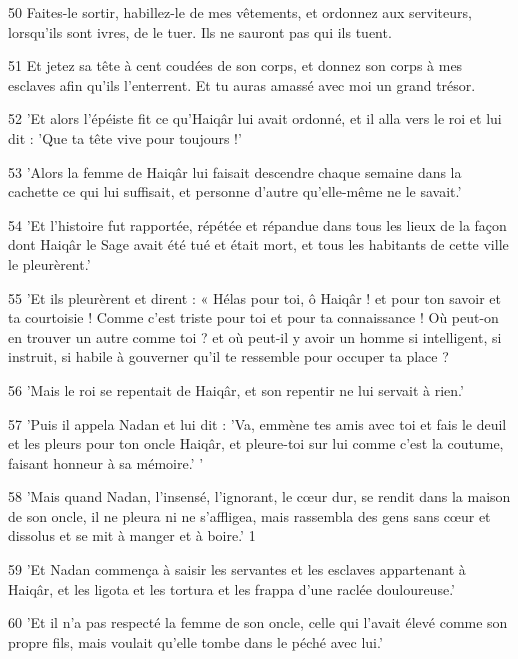 \par 50 Faites-le sortir, habillez-le de mes vêtements, et ordonnez aux serviteurs, lorsqu'ils sont ivres, de le tuer. Ils ne sauront pas qui ils tuent.

\par 51 Et jetez sa tête à cent coudées de son corps, et donnez son corps à mes esclaves afin qu'ils l'enterrent. Et tu auras amassé avec moi un grand trésor.

\par 52 'Et alors l'épéiste fit ce qu'Haiqâr lui avait ordonné, et il alla vers le roi et lui dit : 'Que ta tête vive pour toujours !'

\par 53 'Alors la femme de Haiqâr lui faisait descendre chaque semaine dans la cachette ce qui lui suffisait, et personne d'autre qu'elle-même ne le savait.'

\par 54 'Et l'histoire fut rapportée, répétée et répandue dans tous les lieux de la façon dont Haiqâr le Sage avait été tué et était mort, et tous les habitants de cette ville le pleurèrent.'

\par 55 'Et ils pleurèrent et dirent : « Hélas pour toi, ô Haiqâr ! et pour ton savoir et ta courtoisie ! Comme c'est triste pour toi et pour ta connaissance ! Où peut-on en trouver un autre comme toi ? et où peut-il y avoir un homme si intelligent, si instruit, si habile à gouverner qu'il te ressemble pour occuper ta place ?

\par 56 'Mais le roi se repentait de Haiqâr, et son repentir ne lui servait à rien.'

\par 57 'Puis il appela Nadan et lui dit : 'Va, emmène tes amis avec toi et fais le deuil et les pleurs pour ton oncle Haiqâr, et pleure-toi sur lui comme c'est la coutume, faisant honneur à sa mémoire.' '

\par 58 'Mais quand Nadan, l'insensé, l'ignorant, le cœur dur, se rendit dans la maison de son oncle, il ne pleura ni ne s'affligea, mais rassembla des gens sans cœur et dissolus et se mit à manger et à boire.' 1

\par 59 'Et Nadan commença à saisir les servantes et les esclaves appartenant à Haiqâr, et les ligota et les tortura et les frappa d'une raclée douloureuse.'

\par 60 'Et il n'a pas respecté la femme de son oncle, celle qui l'avait élevé comme son propre fils, mais voulait qu'elle tombe dans le péché avec lui.'

